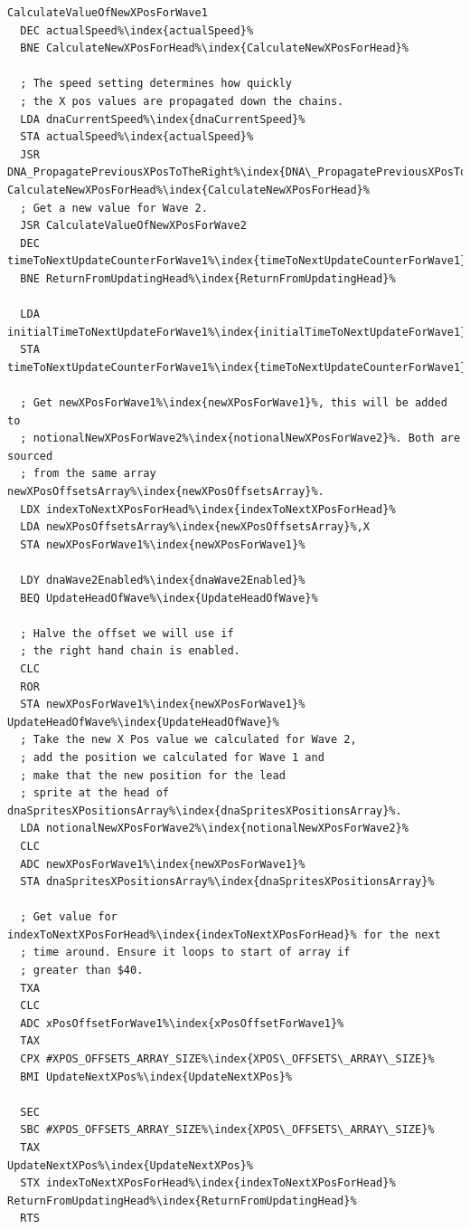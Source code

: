 \hspace{0.5cm}
\begin{minipage}[b]{0.55\linewidth}
\centering
  \begin{lstlisting}[escapechar=\%,basicstyle=\tiny, caption=Calculate the new X Pos value for the head sprites\index{sprites}\, as well as propagate the
  values in \icode{dnaXPosDataHeadArray} to the right when required.]
CalculateValueOfNewXPosForWave1
  DEC actualSpeed%\index{actualSpeed}%
  BNE CalculateNewXPosForHead%\index{CalculateNewXPosForHead}%

  ; The speed setting determines how quickly 
  ; the X pos values are propagated down the chains.
  LDA dnaCurrentSpeed%\index{dnaCurrentSpeed}%
  STA actualSpeed%\index{actualSpeed}%
  JSR DNA_PropagatePreviousXPosToTheRight%\index{DNA\_PropagatePreviousXPosToTheRight}%
CalculateNewXPosForHead%\index{CalculateNewXPosForHead}%   
  ; Get a new value for Wave 2.
  JSR CalculateValueOfNewXPosForWave2
  DEC timeToNextUpdateCounterForWave1%\index{timeToNextUpdateCounterForWave1}%
  BNE ReturnFromUpdatingHead%\index{ReturnFromUpdatingHead}%

  LDA initialTimeToNextUpdateForWave1%\index{initialTimeToNextUpdateForWave1}%
  STA timeToNextUpdateCounterForWave1%\index{timeToNextUpdateCounterForWave1}%

  ; Get newXPosForWave1%\index{newXPosForWave1}%, this will be added to
  ; notionalNewXPosForWave2%\index{notionalNewXPosForWave2}%. Both are sourced
  ; from the same array newXPosOffsetsArray%\index{newXPosOffsetsArray}%.
  LDX indexToNextXPosForHead%\index{indexToNextXPosForHead}%
  LDA newXPosOffsetsArray%\index{newXPosOffsetsArray}%,X
  STA newXPosForWave1%\index{newXPosForWave1}%

  LDY dnaWave2Enabled%\index{dnaWave2Enabled}%
  BEQ UpdateHeadOfWave%\index{UpdateHeadOfWave}%

  ; Halve the offset we will use if
  ; the right hand chain is enabled.
  CLC
  ROR 
  STA newXPosForWave1%\index{newXPosForWave1}%
UpdateHeadOfWave%\index{UpdateHeadOfWave}%   
  ; Take the new X Pos value we calculated for Wave 2,
  ; add the position we calculated for Wave 1 and 
  ; make that the new position for the lead
  ; sprite at the head of dnaSpritesXPositionsArray%\index{dnaSpritesXPositionsArray}%.
  LDA notionalNewXPosForWave2%\index{notionalNewXPosForWave2}%
  CLC
  ADC newXPosForWave1%\index{newXPosForWave1}%
  STA dnaSpritesXPositionsArray%\index{dnaSpritesXPositionsArray}%

  ; Get value for indexToNextXPosForHead%\index{indexToNextXPosForHead}% for the next
  ; time around. Ensure it loops to start of array if 
  ; greater than $40.
  TXA
  CLC
  ADC xPosOffsetForWave1%\index{xPosOffsetForWave1}%
  TAX
  CPX #XPOS_OFFSETS_ARRAY_SIZE%\index{XPOS\_OFFSETS\_ARRAY\_SIZE}%
  BMI UpdateNextXPos%\index{UpdateNextXPos}%

  SEC
  SBC #XPOS_OFFSETS_ARRAY_SIZE%\index{XPOS\_OFFSETS\_ARRAY\_SIZE}%
  TAX
UpdateNextXPos%\index{UpdateNextXPos}%   
  STX indexToNextXPosForHead%\index{indexToNextXPosForHead}%
ReturnFromUpdatingHead%\index{ReturnFromUpdatingHead}%   
  RTS
\end{lstlisting}
\end{minipage}
